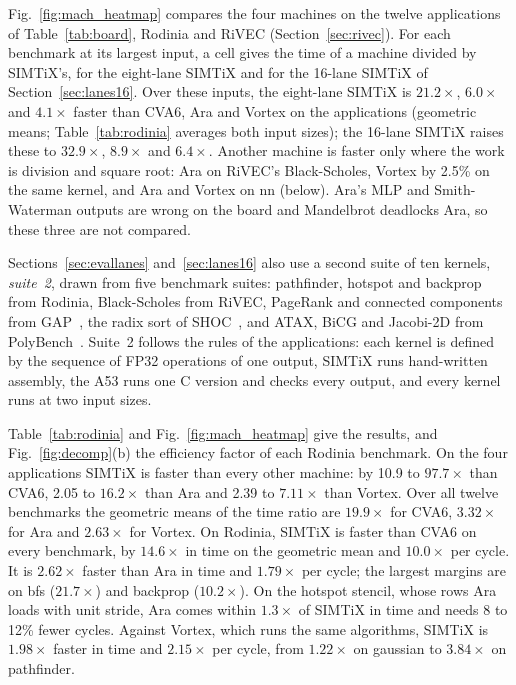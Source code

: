 \documentclass[journal]{IEEEtran}
\begin{document}
Fig.~\ref{fig:mach_heatmap} compares the four machines on the twelve applications of
Table~\ref{tab:board}, Rodinia and RiVEC (Section~\ref{sec:rivec}). For each benchmark
at its largest input, a cell gives the time of a machine divided by SIMTiX's, for the
eight-lane SIMTiX and for the 16-lane SIMTiX of Section~\ref{sec:lanes16}. Over these
inputs, the eight-lane SIMTiX is $21.2\times$, $6.0\times$ and $4.1\times$ faster than
CVA6, Ara and Vortex on the applications (geometric means; Table~\ref{tab:rodinia}
averages both input sizes); the 16-lane SIMTiX raises these to $32.9\times$,
$8.9\times$ and $6.4\times$. Another machine is faster only where the work is division
and square root: Ara on RiVEC's Black-Scholes, Vortex by 2.5\% on the same kernel, and
Ara and Vortex on nn (below). Ara's MLP and Smith-Waterman outputs are wrong on the
board and Mandelbrot deadlocks Ara, so these three are not compared.

Sections~\ref{sec:evallanes} and~\ref{sec:lanes16} also use a second suite of ten kernels,
\emph{suite~2}, drawn from five benchmark suites: pathfinder, hotspot and backprop from
Rodinia, Black-Scholes from RiVEC, PageRank and connected components from
GAP~\cite{gap}, the radix sort of SHOC~\cite{shoc}, and ATAX, BiCG and Jacobi-2D from
PolyBench~\cite{polybench}. Suite~2 follows the rules of the applications: each kernel
is defined by the sequence of FP32 operations of one output, SIMTiX runs hand-written
assembly, the A53 runs one C version and checks every output, and every kernel runs at
two input sizes.

Table~\ref{tab:rodinia} and Fig.~\ref{fig:mach_heatmap} give the results, and
Fig.~\ref{fig:decomp}(b) the efficiency factor of each Rodinia benchmark. On the four applications SIMTiX is faster than every other
machine: by 10.9 to $97.7\times$ than CVA6, 2.05 to $16.2\times$ than Ara and 2.39 to
$7.11\times$ than Vortex. Over all twelve benchmarks the geometric means of the time
ratio are $19.9\times$ for CVA6, $3.32\times$ for Ara and $2.63\times$ for Vortex.
On Rodinia, SIMTiX is faster than CVA6 on every
benchmark, by $14.6\times$ in time on the geometric mean and $10.0\times$ per cycle. It
is $2.62\times$ faster than Ara in time and $1.79\times$ per cycle; the largest
margins are on bfs ($21.7\times$) and backprop ($10.2\times$). On the hotspot stencil,
whose rows Ara loads with unit stride, Ara comes within $1.3\times$ of SIMTiX in time
and needs 8 to 12\% fewer cycles. Against Vortex, which runs the same algorithms,
SIMTiX is $1.98\times$ faster in time and $2.15\times$ per cycle, from $1.22\times$ on
gaussian to $3.84\times$ on pathfinder.
\end{document}
